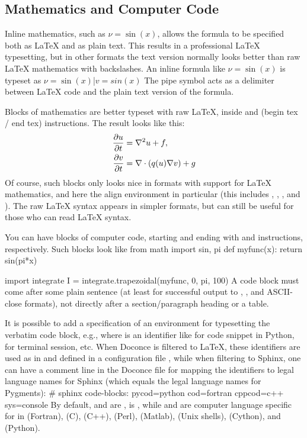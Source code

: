 \documentclass[twoside]{book}
\begin{document}
\noindent

\subsection{Mathematics and Computer Code}

Inline mathematics, such as $\nu = \sin(x)$,
allows the formula to be specified both as {\LaTeX} and as plain text.
This results in a professional {\LaTeX} typesetting, but in other formats
the text version normally looks better than raw {\LaTeX} mathematics with
backslashes. An inline formula like $\nu = \sin(x)$ is
typeset as
\bccq
$\nu = \sin(x)$|$v = sin(x)$
\eccq
The pipe symbol acts as a delimiter between {\LaTeX} code and the plain text
version of the formula.

Blocks of mathematics are better typeset with raw {\LaTeX}, inside
 and  (begin tex / end tex) instructions.
The result looks like this:
\begin{align}
{\partial u\over\partial t} &= \nabla^2 u + f, \label{myeq1}\\
{\partial v\over\partial t} &= \nabla\cdot(q(u)\nabla v) + g
\end{align}
Of course, such blocks only looks nice in formats with support
for {\LaTeX} mathematics, and here the align environment in particular
(this includes , , , and ). The raw
{\LaTeX} syntax appears in simpler formats, but can still be useful
for those who can read {\LaTeX} syntax.

You can have blocks of computer code, starting and ending with
 and  instructions, respectively. Such blocks look like
\bcod
from math import sin, pi
def myfunc(x):
    return sin(pi*x)

import integrate
I = integrate.trapezoidal(myfunc, 0, pi, 100)
\ecod
A code block must come after some plain sentence (at least for successful
output to , , and ASCII-close formats),
not directly after a section/paragraph heading or a table.

It is possible to add a specification of an
environment for typesetting the verbatim code block, e.g., 
where  is an identifier like  for code snippet in Python,
 for terminal session, etc. When Doconce is filtered to {\LaTeX},
these identifiers are used as in  and defined in a
configuration file , while when filtering
to Sphinx, one can have a comment line in the Doconce file for
mapping the identifiers to legal language names for Sphinx (which equals
the legal language names for Pygments):
\bccq
# sphinx code-blocks: pycod=python cod=fortran cppcod=c++ sys=console
\eccq
By default,  and  are ,  is ,
while  and  are computer language specific for 
in  (Fortran),  (C),  (C++),  (Perl),  (Matlab),
 (Unix shells),  (Cython), and  (Python).
\end{document}
